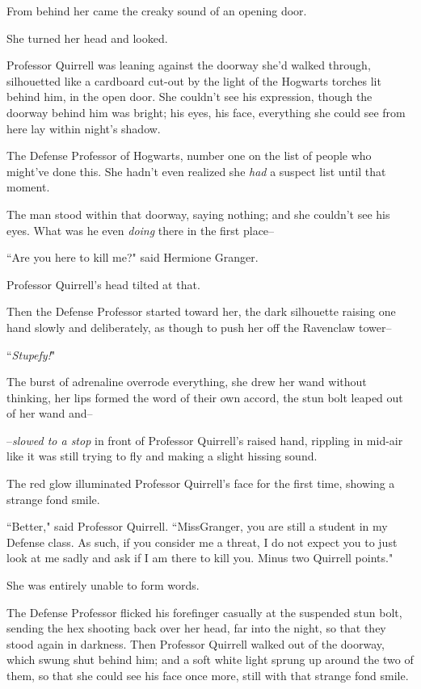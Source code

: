 From behind her came the creaky sound of an opening door.

She turned her head and looked.

Professor Quirrell was leaning against the doorway she'd walked through, silhouetted like a cardboard cut-out by the light of the Hogwarts torches lit behind him, in the open door. She couldn't see his expression, though the doorway behind him was bright; his eyes, his face, everything she could see from here lay within night's shadow.

The Defense Professor of Hogwarts, number one on the list of people who might've done this. She hadn't even realized she \emph{had} a suspect list until that moment.

The man stood within that doorway, saying nothing; and she couldn't see his eyes. What was he even \emph{doing} there in the first place\---

``Are you here to kill me?" said Hermione Granger.

Professor Quirrell's head tilted at that.

Then the Defense Professor started toward her, the dark silhouette raising one hand slowly and deliberately, as though to push her off the Ravenclaw tower\---

``\emph{Stupefy!}"

The burst of adrenaline overrode everything, she drew her wand without thinking, her lips formed the word of their own accord, the stun bolt leaped out of her wand and\---

\---\emph{slowed to a stop} in front of Professor Quirrell's raised hand, rippling in mid-air like it was still trying to fly and making a slight hissing sound.

The red glow illuminated Professor Quirrell's face for the first time, showing a strange fond smile.

``Better," said Professor Quirrell. ``Miss\?Granger, you are still a student in my Defense class. As such, if you consider me a threat, I do not expect you to just look at me sadly and ask if I am there to kill you. Minus two Quirrell points."

She was entirely unable to form words.

The Defense Professor flicked his forefinger casually at the suspended stun bolt, sending the hex shooting back over her head, far into the night, so that they stood again in darkness. Then Professor Quirrell walked out of the doorway, which swung shut behind him; and a soft white light sprung up around the two of them, so that she could see his face once more, still with that strange fond smile.

